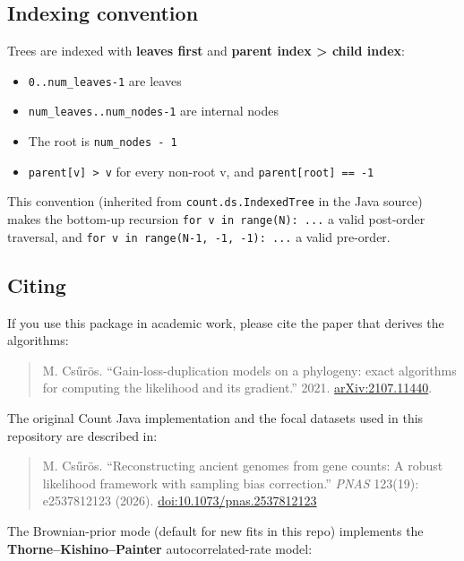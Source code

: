 \documentclass[
  10pt,
]{article}
\providecommand{\tightlist}{%
  \setlength{\itemsep}{0pt}\setlength{\parskip}{0pt}}
\begin{document}
\subsection{Indexing convention}\label{indexing-convention}

Trees are indexed with \textbf{leaves first} and \textbf{parent index
\textgreater{} child index}:

\begin{itemize}
\tightlist
\item
  \texttt{0..num\_leaves-1} are leaves
\item
  \texttt{num\_leaves..num\_nodes-1} are internal nodes
\item
  The root is \texttt{num\_nodes\ -\ 1}
\item
  \texttt{parent{[}v{]}\ \textgreater{}\ v} for every non-root v, and
  \texttt{parent{[}root{]}\ ==\ -1}
\end{itemize}

This convention (inherited from \texttt{count.ds.IndexedTree} in the
Java source) makes the bottom-up recursion
\texttt{for\ v\ in\ range(N):\ ...} a valid post-order traversal, and
\texttt{for\ v\ in\ range(N-1,\ -1,\ -1):\ ...} a valid pre-order.

\subsection{Citing}\label{citing}

If you use this package in academic work, please cite the paper that
derives the algorithms:

\begin{quote}
M. Csűrös. ``Gain-loss-duplication models on a phylogeny: exact
algorithms for computing the likelihood and its gradient.'' 2021.
\href{https://arxiv.org/abs/2107.11440}{arXiv:2107.11440}.
\end{quote}

The original Count Java implementation and the focal datasets used in
this repository are described in:

\begin{quote}
M. Csűrös. ``Reconstructing ancient genomes from gene counts: A robust
likelihood framework with sampling bias correction.'' \emph{PNAS}
123(19): e2537812123 (2026).
\href{https://doi.org/10.1073/pnas.2537812123}{doi:10.1073/pnas.2537812123}
\end{quote}

The Brownian-prior mode (default for new fits in this repo) implements
the \textbf{Thorne--Kishino--Painter} autocorrelated-rate model:
\end{document}
